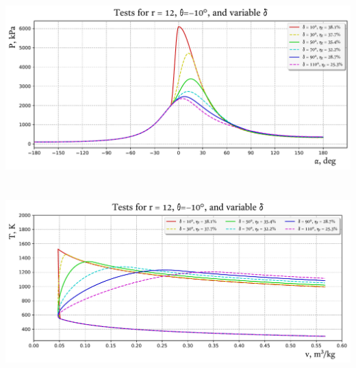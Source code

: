     \begin{frame}{}\vspace*{-2em}
        \begin{center}
            \noindent\hspace*{-4.5mm}\includegraphics[height=70.0mm]{fig/test_r=12,0_speed-a.pdf}
        \end{center}
    \end{frame}

    \begin{frame}{}\vspace*{-2em}
        \begin{center}
            \noindent\hspace*{-4.5mm}\includegraphics[height=70.0mm]{fig/test_r=12,0_speed-T.pdf}
        \end{center}
    \end{frame}


